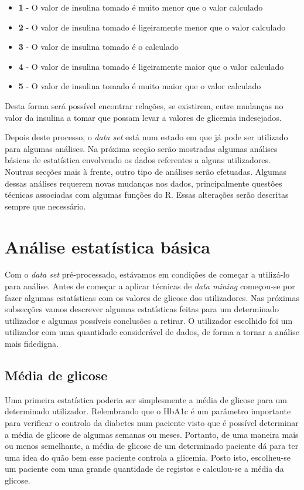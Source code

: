 \begin{itemize}
\item \textbf{1} - O valor de insulina tomado é muito menor que o valor calculado
\item \textbf{2} - O valor de insulina tomado é ligeiramente menor que o valor calculado
\item \textbf{3} - O valor de insulina tomado é o calculado
\item \textbf{4} - O valor de insulina tomado é ligeiramente maior que o valor calculado
\item \textbf{5} - O valor de insulina tomado é muito maior que o valor calculado
\end{itemize}

Desta forma será possível encontrar relações, se existirem, entre mudanças no valor da insulina a tomar que possam levar a valores de glicemia indesejados. 


Depois deste processo, o \textit{data set} está num estado em que já pode ser utilizado para algumas análises. Na próxima secção serão mostradas algumas análises básicas de estatística envolvendo os dados referentes a alguns utilizadores. Noutras secções mais à frente, outro tipo de análises serão efetuadas. Algumas dessas análises requerem novas mudanças nos dados, principalmente questões técnicas associadas com algumas funções do R. Essas alterações serão descritas sempre que necessário.

\section{Análise estatística básica}

Com o \textit{data set} pré-processado, estávamos em condições de começar a utilizá-lo para análise. Antes de começar a aplicar técnicas de \textit{data mining} começou-se por fazer algumas estatísticas com os valores de glicose dos utilizadores. Nas próximas subsecções vamos descrever algumas estatísticas feitas para um determinado utilizador e algumas possíveis conclusões a retirar. O utilizador escolhido foi um utilizador com uma quantidade considerável de dados, de forma a tornar a análise mais fidedigna.

\subsection{Média de glicose}

Uma primeira estatística poderia ser simplesmente a média de glicose para um determinado utilizador. Relembrando que o HbA1c é um parâmetro importante para verificar o controlo da diabetes num paciente visto que é possível determinar a média de glicose de algumas semanas ou meses. Portanto, de uma maneira mais ou menos semelhante, a média de glicose de um determinado paciente dá para ter uma idea do quão bem esse paciente controla a glicemia. Posto isto, escolheu-se um paciente com uma grande quantidade de registos e calculou-se a média da glicose. 

